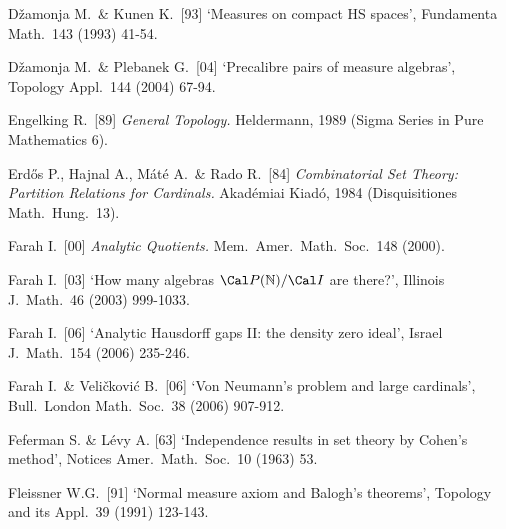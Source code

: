 {%

D\v{z}amonja M.\ \& Kunen K.\ [93] `Measures on compact HS spaces',
Fundamenta Math.\ 143 (1993) 41-54.
\cmmnt{[\S531 {\it notes\/}.]}


D\v{z}amonja M.\ \& Plebanek G.\ [04]
`Precalibre pairs of measure algebras',
Topology Appl.\ 144 (2004) 67-94.
\cmmnt{[525L.]}

\medskip%

Engelking R.\ [89] {\it General Topology.} Heldermann, 1989 (Sigma
Series in Pure Mathematics 6).
\cmmnt{[\S5A4.]}


Erd\H{o}s P., Hajnal A., M\'at\'e A.\ \& Rado R.\ [84] {\it Combinatorial
Set Theory:  Partition Relations for Cardinals.}   Akad\'emiai Kiad\'o,
1984 (Disquisitiones Math.\ Hung.\ 13).
\cmmnt{[5A1F, 5A1H, 5A6F.]}

\medskip%

Farah I.\ [00] {\it Analytic Quotients.}
Mem.\ Amer.\ Math.\ Soc.\ 148 (2000).
\cmmnt{[5A6H.]}

Farah I.\ [03] `How many algebras $\Cal P(\Bbb N)/\Cal I$ are there?',
Illinois J.\ Math.\ 46 (2003) 999-1033.
\cmmnt{[\S556 {\it notes\/}.]}

Farah I.\ [06] `Analytic Hausdorff gaps II: the density zero ideal',
Israel J.\ Math.\ 154 (2006) 235-246.
\cmmnt{[556S.]}

Farah I.\ \& Veli\v{c}kovi\'c B.\ [06]
`Von Neumann's problem and large cardinals',
Bull.\ London Math.\ Soc.\ 38 (2006) 907-912.
\cmmnt{[539Q.]}

Feferman S. \& L\'evy A. [63] `Independence results in set theory by Cohen's
method', Notices Amer.\ Math.\ Soc.\ 10 (1963) 53.
\cmmnt{[561A.]}

Fleissner W.G.\ [91]
`Normal measure axiom and Balogh's theorems', Topology and its Appl.\
39 (1991) 123-143.
\cmmnt{[555N.]}



}
